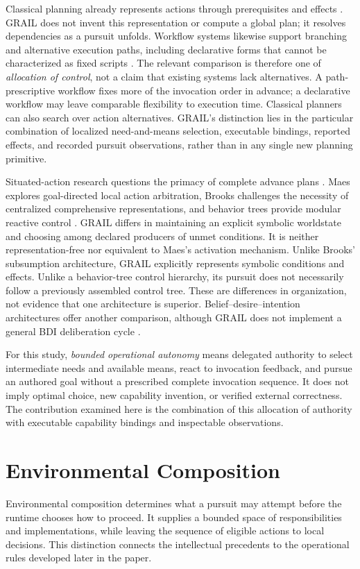 \documentclass[11pt]{article}
\begin{document}
Classical planning already represents actions through prerequisites and effects \cite{FikesNilsson1971,McDermott1998}. GRAIL does not invent this representation or compute a global plan; it resolves dependencies as a pursuit unfolds. Workflow systems likewise support branching and alternative execution paths, including declarative forms that cannot be characterized as fixed scripts \cite{Aalst2003}. The relevant comparison is therefore one of \emph{allocation of control}, not a claim that existing systems lack alternatives. A path-prescriptive workflow fixes more of the invocation order in advance; a declarative workflow may leave comparable flexibility to execution time. Classical planners can also search over action alternatives. GRAIL's distinction lies in the particular combination of localized need-and-means selection, executable bindings, reported effects, and recorded pursuit observations, rather than in any single new planning primitive.

Situated-action research questions the primacy of complete advance plans \cite{Suchman1987}. Maes explores goal-directed local action arbitration, Brooks challenges the necessity of centralized comprehensive representations, and behavior trees provide modular reactive control \cite{Maes1990,Brooks1991,Colledanchise2018}. GRAIL differs in maintaining an explicit symbolic worldstate and choosing among declared producers of unmet conditions. It is neither representation-free nor equivalent to Maes's activation mechanism. Unlike Brooks' subsumption architecture, GRAIL explicitly represents symbolic conditions and effects. Unlike a behavior-tree control hierarchy, its pursuit does not necessarily follow a previously assembled control tree. These are differences in organization, not evidence that one architecture is superior. Belief--desire--intention architectures offer another comparison, although GRAIL does not implement a general BDI deliberation cycle \cite{RaoGeorgeff1995}.

For this study, \emph{bounded operational autonomy} means delegated authority to select intermediate needs and available means, react to invocation feedback, and pursue an authored goal without a prescribed complete invocation sequence. It does not imply optimal choice, new capability invention, or verified external correctness. The contribution examined here is the combination of this allocation of authority with executable capability bindings and inspectable observations.

\section{Environmental Composition}
Environmental composition determines what a pursuit may attempt before the runtime chooses how to proceed. It supplies a bounded space of responsibilities and implementations, while leaving the sequence of eligible actions to local decisions. This distinction connects the intellectual precedents to the operational rules developed later in the paper.
\end{document}
